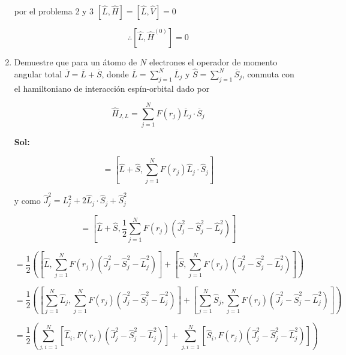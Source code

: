 \documentclass[12pt,a4paper]{article}
\begin{document}
\begin{enumerate}
por el problema 2 y 3  $[\hat{L}, \hat{H}] = [\hat{L}, \hat{V}] = 0$

\begin{equation*}
    \therefore [\hat{L}, \hat{H}^{(0)}] = 0
\end{equation*}







\item Demuestre que para un átomo de $N$ electrones el operador de momento angular total $\overline{J} = \overline{L} + \overline{S}$, donde $\overline{L} = \sum_{j=1}^{N} \overline{L}_{j}$ y $\hat{S} = \sum_{j=1}^{N} \overline{S}_j$, conmuta con el hamiltoniano de interacción espín-orbital dado por

\begin{equation*}
    \hat{H}_{J,L} = \sum_{j=1}^{N} F(r_j) \overline{L}_j  \cdot \overline{S}_j
\end{equation*}

\textbf{Sol:}

\begin{equation*}
    [\hat{J}, \hat{H]_{J,L}}] = [\hat{L} + \hat{S}, \sum_{j=1}^{N} F(r_j) \hat{L}_j \cdot  \hat{S}_j]
\end{equation*}

y como $\hat{J}_{j}^{2} = L_{j}^{2}+ 2 \hat{L}_j \cdot \hat{S}_j + \hat{S}_{j}^2 $

\begin{equation*}
    [\hat{J}, \hat{H]_{J,L}}]=  [\hat{L} + \hat{S},\frac{1}{2} \sum_{j=1}^{N} F(r_j) (\hat{J}_{j}^{2} -\hat{S}_{j}^2 - \hat{L}_{j}^{2})]
\end{equation*}

\begin{equation*}
    = \frac{1}{2}\left([\hat{L},\sum_{j=1}^{N} F(r_j) (\hat{J}_{j}^{2} -\hat{S}_{j}^2 - \hat{L}_{j}^{2})] + [\hat{S},\sum_{j=1}^{N} F(r_j) (\hat{J}_{j}^{2} -\hat{S}_{j}^2 - \hat{L}_{j}^{2})]\right)
\end{equation*}

\begin{equation*}
    = \frac{1}{2}\left([\sum_{j=1}^{N}\hat{L}_j,\sum_{j=1}^{N} F(r_j) (\hat{J}_{j}^{2} -\hat{S}_{j}^2 - \hat{L}_{j}^{2})] + [\sum_{j=1}^{N}\hat{S}_j,\sum_{j=1}^{N} F(r_j) (\hat{J}_{j}^{2} -\hat{S}_{j}^2 - \hat{L}_{j}^{2})]\right)
\end{equation*}

\begin{equation*}
    = \frac{1}{2}\left(\sum_{j,i=1}^{N}[\hat{L}_i,F(r_j) (\hat{J}_{j}^{2} -\hat{S}_{j}^2 - \hat{L}_{j}^{2})] + \sum_{j,i=1}^{N}[\hat{S}_i,F(r_j) (\hat{J}_{j}^{2} -\hat{S}_{j}^2 - \hat{L}_{j}^{2})]\right)
\end{equation*}


\end{enumerate}
\end{document}

